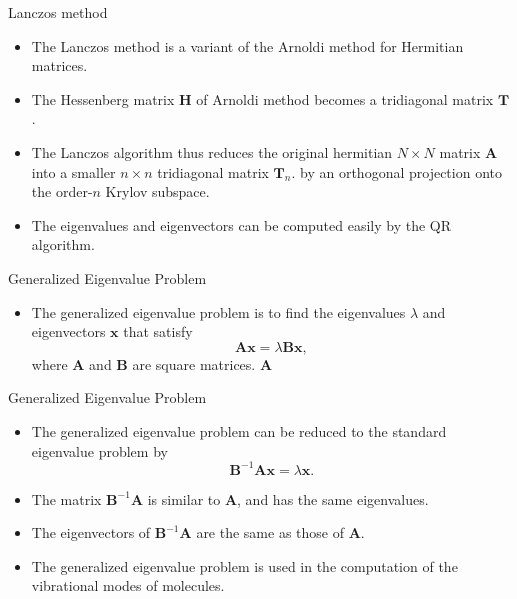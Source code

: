 \documentclass{beamer}
\begin{document}
\begin{frame}{Lanczos method}
\begin{itemize}
    \item The Lanczos method is a variant of the Arnoldi method for Hermitian matrices.
    \item The Hessenberg matrix $\mathbf{H}$ of Arnoldi method becomes a tridiagonal matrix $\mathbf{T}$.
    \item The Lanczos algorithm thus reduces the original hermitian $N\times N$ matrix $\mathbf{A}$ into a smaller $n\times n$ tridiagonal matrix $\mathbf{T}_n$.
    by an orthogonal projection onto the order-$n$ Krylov subspace.
    \item The eigenvalues and eigenvectors can be computed easily by the QR algorithm.
\end{itemize}
\end{frame}


\begin{frame}{Generalized Eigenvalue Problem}
    \begin{itemize}
    \item The generalized eigenvalue problem is to find the eigenvalues $\lambda$ and eigenvectors $\mathbf{x}$ that satisfy
    \[
    \mathbf{A x}=\lambda \mathbf{B x},
    \]
    where $\mathbf{A}$ and $\mathbf{B}$ are square matrices. $\mathbf{A}$
    \end{itemize}
\end{frame}
\begin{frame}{Generalized Eigenvalue Problem}
    \begin{itemize}
        \item The generalized eigenvalue problem can be reduced to the standard eigenvalue problem by 
        \[
        \mathbf{B}^{-1} \mathbf{A x}=\lambda \mathbf{x}.
        \]
        \item The matrix $\mathbf{B}^{-1} \mathbf{A}$ is similar to $\mathbf{A}$, and has the same eigenvalues.
        \item The eigenvectors of $\mathbf{B}^{-1} \mathbf{A}$ are the same as those of $\mathbf{A}$.
        \item The generalized eigenvalue problem is used in the computation of the vibrational modes of molecules.
    \end{itemize}
\end{frame}
\end{document}
